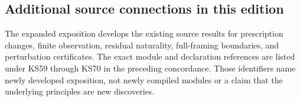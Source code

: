 \subsection*{Additional source connections in this edition}
The expanded exposition develops the existing source results for prescription changes, finite observation, residual naturality, full-framing boundaries, and perturbation certificates. The exact module and declaration references are listed under KS59 through KS70 in the preceding concordance. Those identifiers name newly developed exposition, not newly compiled modules or a claim that the underlying principles are new discoveries.
